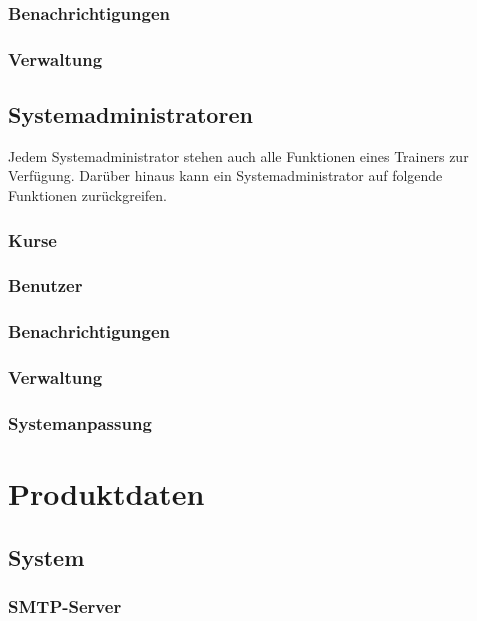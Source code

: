 \documentclass[a4paper]{scrreprt}
\newcounter{Lc}
\newcounter{Hc}
\newcommand{\stepHc}{\stepcounter{Hc}\setcounter{Lc}{0}}
\begin{document}
\subsection{Benachrichtigungen}

\subsection{Verwaltung}



\section{Systemadministratoren}
Jedem Systemadministrator stehen auch alle Funktionen eines Trainers zur Verfügung. Darüber hinaus kann ein Systemadministrator auf folgende Funktionen zurückgreifen.
\stepHc
\subsection{Kurse}

\subsection{Benutzer}

\subsection{Benachrichtigungen}

\subsection{Verwaltung}

\subsection{Systemanpassung}
		
		

\chapter{Produktdaten}
 \label{Produktdaten}
        
	
    \section{System}
	    
	    
	    
	    \subsection{SMTP-Server}
	    
\end{document}
